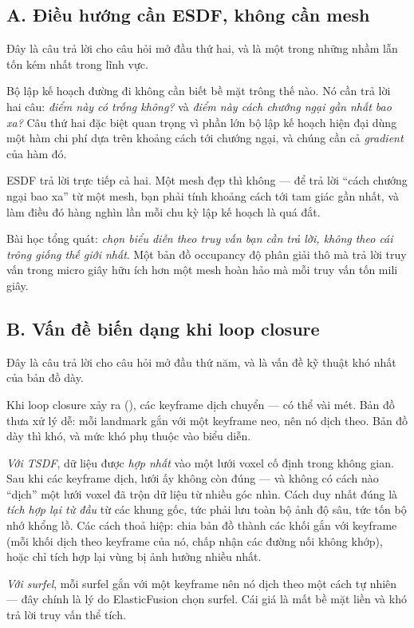 \documentclass[../../vslam.tex]{subfiles}
\begin{document}
\subsection{A. Điều hướng cần ESDF, không cần mesh}

Đây là câu trả lời cho câu hỏi mở đầu thứ hai, và là một trong những nhầm lẫn tốn kém nhất trong lĩnh vực.

Bộ lập kế hoạch đường đi không cần biết bề mặt trông thế nào. Nó cần trả lời hai câu: \emph{điểm này có trống không?} và \emph{điểm này cách chướng ngại gần nhất bao xa?} Câu thứ hai đặc biệt quan trọng vì phần lớn bộ lập kế hoạch hiện đại dùng một hàm chi phí dựa trên khoảng cách tới chướng ngại, và chúng cần cả \emph{gradient} của hàm đó.

ESDF trả lời trực tiếp cả hai. Một mesh đẹp thì không --- để trả lời ``cách chướng ngại bao xa'' từ một mesh, bạn phải tính khoảng cách tới tam giác gần nhất, và làm điều đó hàng nghìn lần mỗi chu kỳ lập kế hoạch là quá đắt.

Bài học tổng quát: \emph{chọn biểu diễn theo truy vấn bạn cần trả lời, không theo cái trông giống thế giới nhất}. Một bản đồ occupancy độ phân giải thô mà trả lời truy vấn trong micro giây hữu ích hơn một mesh hoàn hảo mà mỗi truy vấn tốn mili giây.

\subsection{B. Vấn đề biến dạng khi loop closure}

Đây là câu trả lời cho câu hỏi mở đầu thứ năm, và là vấn đề kỹ thuật khó nhất của bản đồ dày.

Khi loop closure xảy ra (), các keyframe dịch chuyển --- có thể vài mét. Bản đồ thưa xử lý dễ: mỗi landmark gắn với một keyframe neo, nên nó dịch theo. Bản đồ dày thì khó, và mức khó phụ thuộc vào biểu diễn.

\emph{Với TSDF}, dữ liệu được \emph{hợp nhất} vào một lưới voxel cố định trong không gian. Sau khi các keyframe dịch, lưới ấy không còn đúng --- và không có cách nào ``dịch'' một lưới voxel đã trộn dữ liệu từ nhiều góc nhìn. Cách duy nhất đúng là \emph{tích hợp lại từ đầu} từ các khung gốc, tức phải lưu toàn bộ ảnh độ sâu, tức tốn bộ nhớ khổng lồ. Các cách thoả hiệp: chia bản đồ thành các khối gắn với keyframe (mỗi khối dịch theo keyframe của nó, chấp nhận các đường nối không khớp), hoặc chỉ tích hợp lại vùng bị ảnh hưởng nhiều nhất.

\emph{Với surfel}, mỗi surfel gắn với một keyframe nên nó dịch theo một cách tự nhiên --- đây chính là lý do ElasticFusion \cite{whelan2016elasticfusion} chọn surfel. Cái giá là mất bề mặt liền và khó trả lời truy vấn thể tích.
\end{document}
